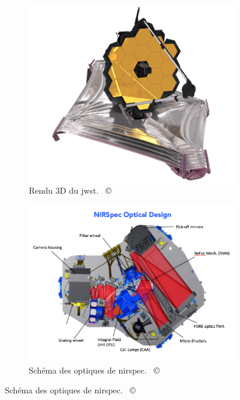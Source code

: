 \documentclass[12pt, a4paper]{article}
\newcommand{\customcite}[1]{\mbox{
  {\small \copyright} \cite{#1}}
}
\begin{document}
\begin{figure}
  \centering
     \begin{subfigure}[b]{0.45\textwidth}
         \centering
         \includegraphics[width=\textwidth]{assets/JWST_spacecraft_model_3.png}
         \caption{Rendu 3D du \gls{jwst}. \customcite{jwst_nasa}}
         \label{fig:jwst}
     \end{subfigure}
     \hfill
     \begin{subfigure}[b]{0.45\textwidth}
         \centering
         \includegraphics[width=\textwidth]{assets/NIRSpec_Optical_design.png}
         \caption{Schéma des optiques de \gls{nirspec}. \customcite{nirspec}}
         \label{fig:nirspec}
     \end{subfigure}
\end{figure}
\end{document}
